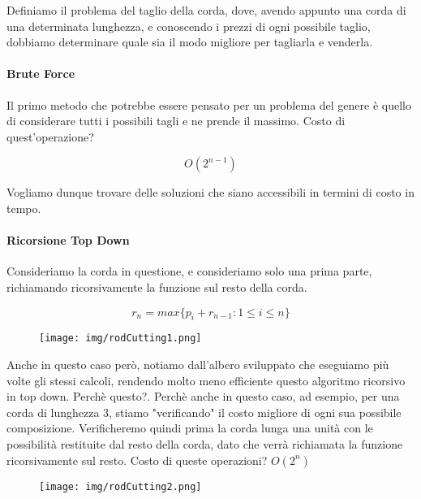 \documentclass{article}
\begin{document}
Definiamo il problema del taglio della corda, dove, avendo appunto una corda di una determinata lunghezza, e conoscendo i prezzi di ogni possibile taglio, dobbiamo determinare quale sia il modo migliore per tagliarla e venderla.

\paragraph{Brute Force} Il primo metodo che potrebbe essere pensato per un problema del genere è quello di considerare tutti i possibili tagli e ne prende il massimo. Costo di quest'operazione?

\begin{equation}
    O(2^{n-1})
\end{equation}

Vogliamo dunque trovare delle soluzioni che siano accessibili in termini di costo in tempo.

\paragraph{Ricorsione Top Down} Consideriamo la corda in questione, e consideriamo solo una prima parte, richiamando ricorsivamente la funzione sul resto della corda. 

\begin{equation}
    r_{n} = max \{ p_{i} + r_{n-1} : 1 \leq i \leq n \}
\end{equation}

\begin{figure}[htbp]
        \center
        \texttt{[image: img/rodCutting1.png]}
    \end{figure}

Anche in questo caso però, notiamo dall'albero sviluppato che eseguiamo più volte gli stessi calcoli, rendendo molto meno efficiente questo algoritmo ricorsivo in top down. Perchè questo?. Perchè anche in questo caso, ad esempio, per una corda di lunghezza 3, stiamo "verificando" il costo migliore di ogni sua possibile composizione. Verificheremo quindi prima la corda lunga una unità con le possibilità restituite dal resto della corda, dato che verrà richiamata la funzione ricorsivamente sul resto. Costo di queste operazioni? $O(2^{n})$

\begin{figure}[htbp]
        \center
        \texttt{[image: img/rodCutting2.png]}
    \end{figure}

\newpage
\end{document}
